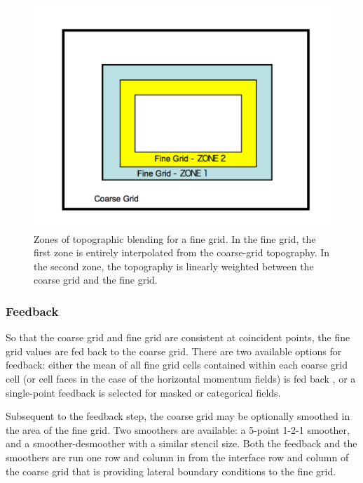 %
%
\begin{figure} 
 \centering
  \includegraphics[width=4.5in]{figures/zone12.pdf}
  \caption{\label{figure:zone12} 
Zones of topographic blending
for a fine grid.  In the fine grid, the first zone is
entirely interpolated from the coarse-grid topography.  In
the second zone, the topography is linearly weighted between
the coarse grid and the fine grid.}
\end{figure}

\subsubsection{Feedback}
So that the coarse grid and fine grid are consistent at coincident points, the 
fine grid values are fed back to the coarse grid.
There are two available 
options for feedback: either the mean of all fine grid cells contained 
within each coarse grid cell (or cell faces in the case of the
horizontal momentum fields) is fed back , or a single-point feedback 
is selected for masked or categorical fields.

Subsequent to the feedback step, the coarse grid may be optionally smoothed in the area
of the fine grid.  Two smoothers are available: a 5-point 1-2-1 smoother, and a smoother-desmoother
with a similar stencil size.
Both the feedback and the smoothers are run one row and column in from the 
interface row and column of the coarse grid that is providing
lateral boundary conditions to the fine grid.

